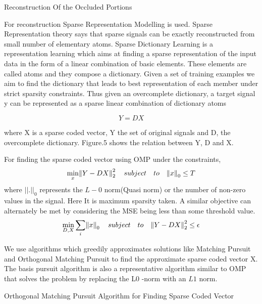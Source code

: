 \documentclass[a4paper, 15pt]{article}
\begin{document}
	\newpage
	\begin{center}
		{\fontsize{20}{30}\selectfont Reconstruction Of the Occluded Portions}\
	\end{center}
	\par
	For reconstruction Sparse Representation Modelling is used. Sparse Representation theory says that sparse signals can be exactly reconstructed from small number of elementary atoms. Sparse Dictionary Learning is a representation learning which aims at finding a sparse representation of the input data in the form of a linear combination of basic elements. These elements are called atoms and they compose a dictionary. Given a set of training examples we aim to find the dictionary that leads to best representation of each member under strict sparsity constraints. Thus given an overcomplete dictionary, a target signal y can be represented as a sparse linear combination of dictionary atoms 
	\par
	\begin{equation}
	Y = DX
	\end{equation}
	\par 
	where X is a sparse coded vector, Y the set of original signals and D, the overcomplete dictionary. Figure.5 shows the relation between Y, D and X.
	\par
	\par 
	For finding the sparse coded vector using OMP under the constraints,
	\begin{equation}
	\min_{x}\norm { Y - DX}^2_{2}  \quad subject \quad to \quad \norm {x}_{0} \leq T
	\end{equation}
	where $||.||_{0}$ represents the $L-0$ norm(Quasi norm) or the number of non-zero values in the signal. Here It is maximum sparsity taken. A similar objective can alternately be met by considering the MSE being less than some threshold value.
	\begin{equation}
	\min_{D, X}\sum_{i}\norm { x }_{0} \quad subject \quad to \quad \norm { Y - DX}^2_{2} \leq \epsilon
	\end{equation}
	\par
	\par 
	We use algorithms which greedily approximates solutions like Matching Pursuit and Orthogonal Matching Pursuit to find the approximate sparse coded vector X. The basis pursuit algorithm is also a representative algorithm similar to OMP that solves the problem by replacing the L0 -norm with an $L1$ norm.
	\par
	\newpage
	\begin{center}
		{\fontsize{20}{30}\selectfont Orthogonal Matching Pursuit Algorithm for Finding Sparse Coded Vector}\
	\end{center}
\end{document}
